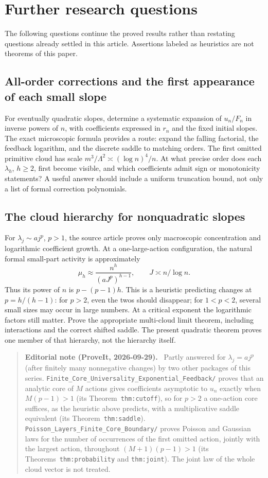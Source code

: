 \documentclass[11pt,a4paper]{article}
\theoremstyle{definition}
\numberwithin{equation}{section}
\newenvironment{ednote}{\par\smallskip\begin{quote}\small\raggedright\textbf{Editorial note (ProveIt, 2026-09-29).}\ }{\end{quote}\smallskip}
\begin{document}
\section{Further research questions}
\label{sec:questions}
The following questions continue the proved results rather than restating
questions already settled in this article. Assertions labeled as heuristics
are not theorems of this paper.

\subsection{All-order corrections and the first appearance of each small slope}
For eventually quadratic slopes, determine a systematic expansion of
\(u_n/F_n\) in inverse powers of \(n\), with coefficients expressed in
\(r_n\) and the fixed initial slopes. The exact microscopic formula
provides a route: expand the falling factorial, the feedback logarithm,
and the discrete saddle to matching orders. The first omitted primitive
cloud has scale \(m^3/\Lambda^2\asymp(\log n)^4/n\).
At what precise order does each \(\lambda_h\), \(h\ge2\), first
become visible, and which coefficients admit sign or monotonicity
statements? A useful answer should include a uniform truncation bound, not
only a list of formal correction polynomials.

\subsection{The cloud hierarchy for nonquadratic slopes}
For \(\lambda_j\sim a j^p\), \(p>1\), the source article proves only
macroscopic concentration and logarithmic coefficient growth. At a
one-large-action configuration, the natural formal small-part activity is
approximately
\[
 \mu_h\approx\frac{n^h}{(aJ^p)^{h-1}},\qquad
 J\asymp n/\log n.
\]
Thus its power of \(n\) is \(p-(p-1)h\). This is a heuristic predicting
changes at \(p=h/(h-1)\): for \(p>2\), even the twos should disappear;
for \(1<p<2\), several small sizes may occur in large numbers. At a
critical exponent the logarithmic factors still matter. Prove the
appropriate multi-cloud limit theorem, including interactions and the
correct shifted saddle. The present quadratic theorem proves one member
of that hierarchy, not the hierarchy itself.
\begin{ednote}
Partly answered for $\lambda_j=aj^p$ (after finitely many nonnegative
changes) by two other packages of this series.
\nolinkurl{Finite_Core_Universality_Exponential_Feedback/} proves that
an analytic core of $M$ actions gives coefficients asymptotic to $u_n$
exactly when $M(p-1)>1$ (its Theorem~\texttt{thm:cutoff}), so for $p>2$ a
one-action core suffices, as the heuristic above predicts, with a
multiplicative saddle equivalent (its Theorem~\texttt{thm:saddle}).
\nolinkurl{Poisson_Layers_Finite_Core_Boundary/} proves Poisson and
Gaussian laws for the number of occurrences of the first omitted action,
jointly with the largest action, throughout $(M+1)(p-1)>1$ (its
Theorems~\texttt{thm:probability} and \texttt{thm:joint}). The joint law of the whole cloud
vector is not treated.
\end{ednote}
\end{document}
